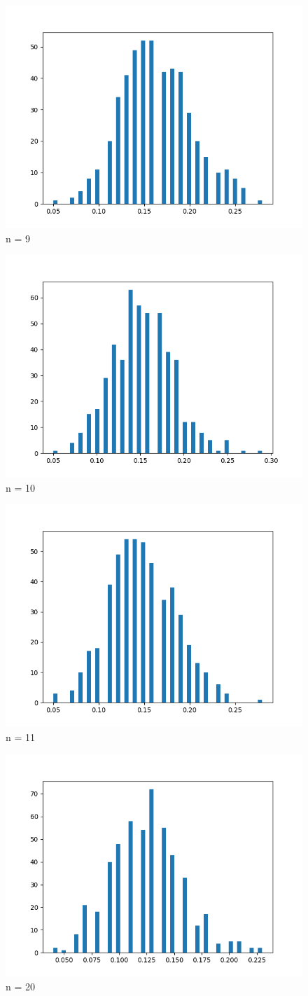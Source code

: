 \documentclass[answers]{exam}
\begin{document}
\begin{framed}
    
\begin{figure}[H] %
    \centering
    \includegraphics[width= 0.5 \textwidth]{Q5.3_n=9.png}
    \caption{n = 9}
\end{figure}

\begin{figure}[H] %
    \centering
    \includegraphics[width= 0.5 \textwidth]{Q5.3_n=10.png}
    \caption{n = 10}
\end{figure}

\begin{figure}[H] %
    \centering
    \includegraphics[width= 0.5 \textwidth]{Q5.3_n=11.png}
    \caption{n = 11}
\end{figure}

\begin{figure}[H] %
    \centering
    \includegraphics[width= 0.5 \textwidth]{Q5.3_n=20.png}
    \caption{n = 20}
\end{figure}



\end{framed}
\end{document}
